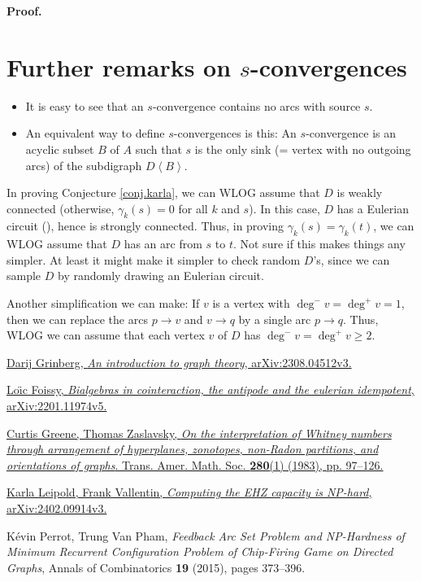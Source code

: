 \documentclass[numbers=enddot,12pt,final,onecolumn,notitlepage]{scrartcl}%
\theoremstyle{definition}
\newenvironment{proof}[1][Proof]{\noindent\textbf{#1.} }{\ \rule{0.5em}{0.5em}}
\newenvironment{noncompile}{}{}
\theoremstyle{plainsl}
\begin{document}
\begin{proof}
\section{Further remarks on $s$-convergences}

\begin{itemize}
\item It is easy to see that an $s$-convergence contains no arcs with source
$s$.

\item An equivalent way to define $s$-convergences is this: An $s$-convergence
is an acyclic subset $B$ of $A$ such that $s$ is the only sink (= vertex with
no outgoing arcs) of the subdigraph $D\left\langle B\right\rangle $.
\end{itemize}

\begin{noncompile}
In proving Conjecture \ref{conj.karla}, we can WLOG assume that $D$ is weakly
connected (otherwise, $\gamma_{k}\left(  s\right)  =0$ for all $k$ and $s$).
In this case, $D$ has a Eulerian circuit (\cite[Theorem 4.7.2]{22s}), hence is
strongly connected. Thus, in proving $\gamma_{k}\left(  s\right)  =\gamma
_{k}\left(  t\right)  $, we can WLOG assume that $D$ has an arc from $s$ to
$t$. Not sure if this makes things any simpler. At least it might make it
simpler to check random $D$'s, since we can sample $D$ by randomly drawing an
Eulerian circuit.

Another simplification we can make: If $v$ is a vertex with $\deg^{-}%
v=\deg^{+}v=1$, then we can replace the arcs $p\rightarrow v$ and
$v\rightarrow q$ by a single arc $p\rightarrow q$. Thus, WLOG we can assume
that each vertex $v$ of $D$ has $\deg^{-}v=\deg^{+}v\geq2$.
\end{noncompile}

\begin{thebibliography}{99999999}                                                                                         %


\href{https://arxiv.org/abs/2308.04512v3}{Darij Grinberg,
\textit{An introduction to graph theory}, arXiv:2308.04512v3.}

%
\href{https://arxiv.org/abs/2201.11974v5}{Lo\"{\i}c Foissy, \textit{Bialgebras
in cointeraction, the antipode and the eulerian idempotent},
arXiv:2201.11974v5.}

%
\href{https://doi.org/10.1090/S0002-9947-1983-0712251-1}{Curtis Greene, Thomas
Zaslavsky, \textit{On the interpretation of Whitney numbers through
arrangement of hyperplanes, zonotopes, non-Radon partitions, and orientations
of graphs}. Trans. Amer. Math. Soc. \textbf{280}(1) (1983), pp. 97--126.}

\href{https://arxiv.org/abs/2402.09914v3}{Karla
Leipold, Frank Vallentin, \textit{Computing the EHZ capacity is NP-hard},
arXiv:2402.09914v3.}

K\'{e}vin Perrot, Trung Van Pham, \textit{Feedback
Arc Set Problem and NP-Hardness of Minimum Recurrent Configuration Problem of
Chip-Firing Game on Directed Graphs}, Annals of Combinatorics \textbf{19}
(2015), pages 373--396.
\end{thebibliography}
\end{document}
